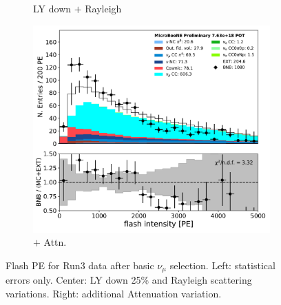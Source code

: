 \documentclass[a4paper]{article}
\begin{document}
\begin{figure}[H]
\begin{center}
\begin{subfigure}[b]{0.3\textwidth}
    \caption{\label{fig:detsys:datamc:flashpe:run3:syst}LY down $+$ Rayleigh}
    \end{subfigure}
    \begin{subfigure}[b]{0.3\textwidth}
    \centering
    \includegraphics[width=1.00\textwidth]{detsys/datamc/flash_pe_03292020_run3_detsys_attn.pdf}
    \caption{\label{fig:detsys:datamc:flashpe:run3:attn}$+$ Attn.}
    \end{subfigure}
\caption{\label{fig:detsys:datamc:flashpe:run3}Flash PE for Run3 data after basic $\nu_{\mu}$ selection. Left: statistical errors only. Center: LY down 25\% and Rayleigh scattering variations. Right: additional Attenuation variation.}
\end{center}
\end{figure}
\end{document}
